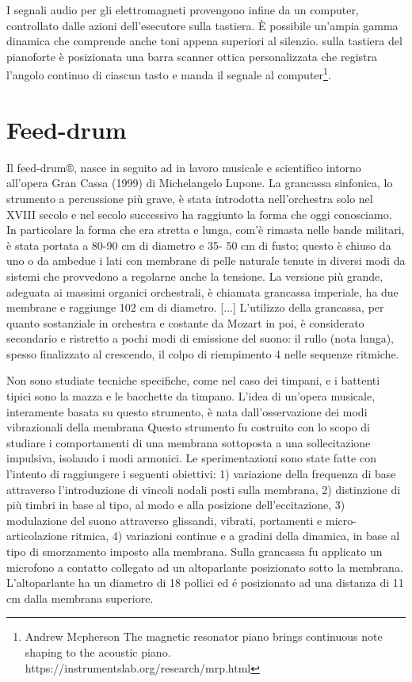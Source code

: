 I segnali audio per gli elettromagneti provengono infine da un computer, controllato dalle azioni dell’esecutore sulla tastiera. È possibile un'ampia gamma dinamica che comprende anche toni appena superiori al silenzio.
sulla tastiera del pianoforte è posizionata una barra scanner ottica personalizzata che registra l'angolo continuo di ciascun tasto e manda il segnale al computer\footnote{ Andrew Mcpherson The magnetic resonator piano brings continuous note shaping to the acoustic piano.   https://instrumentslab.org/research/mrp.html}.

\section{Feed-drum}

Il feed-drum®, nasce in seguito ad in lavoro musicale e scientifico intorno all’opera Gran Cassa  (1999) di Michelangelo Lupone.
La grancassa sinfonica, lo strumento a percussione più grave, è stata introdotta nell’orchestra solo nel XVIII secolo e nel secolo successivo ha raggiunto la forma che oggi conosciamo. 
In particolare la forma che era stretta e lunga, com’è rimasta nelle bande militari, è stata portata a 80-90 cm di diametro e 35- 50 cm di fusto; questo è chiuso da uno o da ambedue i lati con membrane di pelle naturale tenute in diversi modi da sistemi che provvedono a regolarne anche la tensione. 
La versione più grande, adeguata ai massimi organici orchestrali, è chiamata grancassa imperiale, ha due membrane e raggiunge 102 cm di diametro. [...]
L’utilizzo della grancassa, per quanto sostanziale in orchestra e costante da Mozart in poi, è considerato secondario e ristretto a pochi modi di emissione del suono: il rullo (nota lunga), spesso finalizzato al crescendo, il colpo di riempimento 4 nelle sequenze ritmiche. 

Non sono studiate tecniche specifiche, come nel caso dei timpani, e i battenti tipici sono la mazza e le bacchette da timpano. L’idea di un’opera musicale, interamente basata su questo strumento, è nata dall’osservazione dei modi vibrazionali della membrana  
Questo strumento fu costruito con lo scopo di studiare i comportamenti di una membrana sottoposta a una sollecitazione impulsiva, isolando i modi armonici. 
Le sperimentazioni sono state fatte con l’intento di raggiungere i seguenti obiettivi: 
1) variazione della frequenza di base attraverso l’introduzione di vincoli nodali posti sulla membrana,
2) distinzione di più timbri in base al tipo, al modo e alla posizione dell’eccitazione,
3) modulazione del suono attraverso glissandi, vibrati, portamenti e micro-articolazione ritmica,
4) variazioni continue e a gradini della dinamica, in base al tipo di smorzamento imposto alla membrana.
Sulla grancassa fu applicato un microfono a contatto collegato ad un altoparlante posizionato sotto la membrana. 
L’altoparlante ha un diametro di 18 pollici ed é posizionato ad una distanza di 11 cm dalla membrana superiore.


